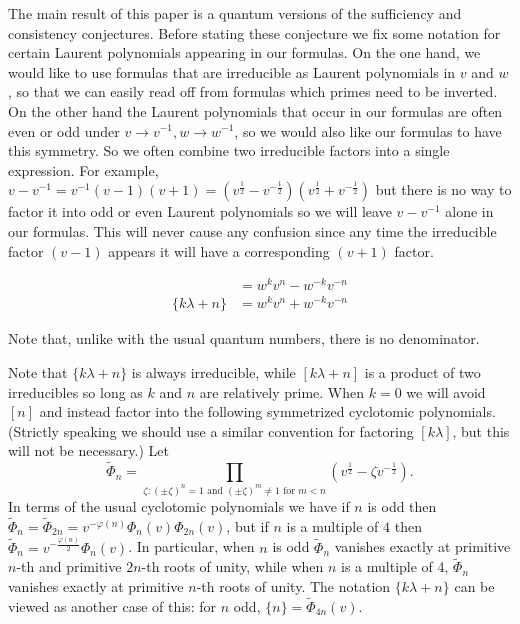 \documentclass[12pt]{amsart}
\begin{document}
The main result of this paper is a quantum versions of the sufficiency and consistency conjectures.  
Before stating these conjecture we fix some notation for certain Laurent polynomials appearing in our formulas.  On the one hand, we would like to use formulas that are irreducible as Laurent polynomials in $v$ and $w$, so that we can easily read off from formulas which primes need to be inverted.  On the other hand the Laurent polynomials that occur in our formulas are often even or odd under $v \rightarrow v^{-1}, w \rightarrow w^{-1}$, so we would also like our formulas to have this symmetry.  So we often combine two irreducible factors into a single expression.  For example, $v-v^{-1} = v^{-1}(v-1)(v+1) = (v^{\frac{1}{2}}-v^{-\frac{1}{2}})(v^{\frac{1}{2}}+v^{-\frac{1}{2}})$ but there is no way to factor it into odd or even Laurent polynomials so we will leave $v-v^{-1}$ alone in our formulas.  This will never cause any confusion since any time the irreducible factor $(v-1)$ appears it will have a corresponding $(v+1)$ factor.

\begin{align*}
[k\lambda + n] &= w^kv^n - w^{-k}v^{-n}\\
\{k\lambda + n\} &= w^k v^n + w^{-k} v^{-n}
\end{align*}

\begin{warning}
Note that, unlike with the usual quantum numbers, there is no denominator.
\end{warning}

Note that $\{k\lambda + n\}$ is always irreducible, while $[k\lambda +
n]$ is a product of two irreducibles so long as $k$ and $n$ are
relatively prime.  When
$k=0$ we will avoid $[n]$ and instead factor into the following
symmetrized cyclotomic polynomials.  (Strictly speaking we should use
a similar convention for factoring $[k \lambda]$, but this will not be
necessary.)  Let
\[
  \widetilde{\Phi}_n = \prod_{\zeta: (\pm \zeta)^n = 1 \text{ and } (\pm \zeta)^m \neq 1 \text{ for $m < n$}}
  (v^{\frac{1}{2}}-\zeta v^{-\frac{1}{2}}).
\]
In terms of the usual cyclotomic polynomials we have if $n$ is odd
then $\widetilde{\Phi}_n = \widetilde{\Phi}_{2n} = v^{-\varphi(n)}
\Phi_n(v) \Phi_{2n}(v)$, but if $n$ is a multiple of $4$ then
$\widetilde{\Phi}_n = v^{-\frac{\varphi(n)}{2}} \Phi_n(v)$. In particular, when $n$ is odd $\widetilde{\Phi}_n$ vanishes exactly at primitive $n$-th and primitive $2n$-th roots of unity, while when $n$ is a multiple of 4, $\widetilde{\Phi}_n$ vanishes exactly at primitive $n$-th roots of unity.
The notation $\{k\lambda + n\}$ can be viewed as another case of this:
for $n$ odd,
$\{n\} = \widetilde{\Phi}_{4n}(v)$.
\end{document}
